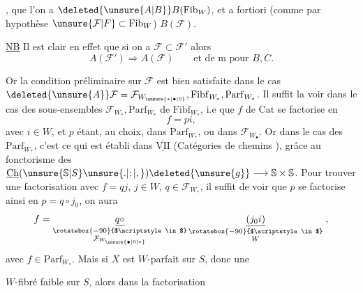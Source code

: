
, que l'on a $\deleted{\unsure{A|B}}B(\mathrm{Fib}_{W})$, et a fortiori (comme par hypothèse $\unsure{\mathcal{F}|F}\subset\mathrm{Fib}_{W}$) $B(\mathcal{F})$.

\uline{NB} Il est clair en effet que si on a $\mathcal{F}\subset\mathcal{F}'$ alors
\[
 A(\mathcal{F}')\Longrightarrow A(\mathcal{F}) \qquad
 \text{et de \={m} pour }B,C. \tag*{(*)}
\]

Or la condition préliminaire sur $\mathcal{F}$ est bien satisfaite dans le cas  $\deleted{\unsure{A}}\mathcal{F}=\mathcal{F}_{W_{\unsure{*|\bullet|0}}},\mathrm{Fibf}_{W_*},\mathrm{Parf}_{W_*}$. Il suffit  la voir dans le cas des sous-ensembles $\mathcal{F}_{W_*},\mathrm{Parf}_{W_*}$ de $\mathrm{Fibf}_{W_*}$, i.e que   $f$ de $\mathrm{Cat}$ se factorise en
\[
 f=pi,
\]
avec $i\in W$, et $p$ étant, au choix, dans $\mathrm{Parf}_{W_*}$, ou dans $\mathcal{F}_{W_{\bullet}}$. Or dans le cas des $\mathrm{Parf}_{W_*}$, \margin{$\Vert$} c'est ce qui est établi dans $\overline{\underline{\mathrm{VII}}}$ (Catégories de chemins ), grâce au fonctorisme des $\underline{\mathrm{Ch}}(\unsure{\mathbb{S}|S}\unsure{.|;|,})\deleted{\unsure{g}}\longrightarrow\mathbb{S}\times\mathbb{S}$. Pour trouver une factorisation avec $f=qj$, $j\in W$, $q\in\mathcal{F}_{W_*}$, il suffit de voir que $p$ se factorise ainsi en $p=q\circ j_0$, on aura
\[
 f=\underset{\substack{\rotatebox{-90}{$\scriptstyle\in$}\\\mathcal{F}_{W_{\unsure{\bullet|0|*}}}}}{\underline{q\circ}}\,
 \underset{\substack{\rotatebox{-90}{$\scriptstyle\in$}\\W}}{\underline{(j_0i)}}\; ,
\]
 avec  $f\in\mathrm{Parf}_{W_*}$. Mais si $X$ est $W$-parfait sur $S$, donc une

$W$-fibré faible sur $S$, alors dans la factorisation


